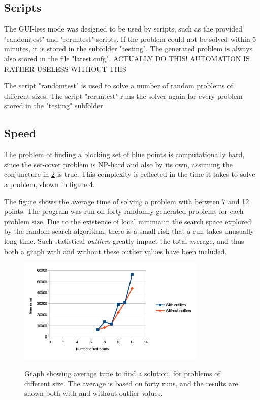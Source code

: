 \documentclass[a4paper,12pt]{article}
\begin{document}
\subsection{Scripts}

The GUI-less mode was designed to be used by scripts, such as the provided "randomtest" and "reruntest" scripts. If the problem could not be solved within 5 minutes, it is stored in the subfolder "testing". The generated problem is always also stored in the file "latest.cnfg". ACTUALLY DO THIS! AUTOMATION IS RATHER USELESS WITHOUT THIS

The script "randomtest" is used to solve a number of random problems of different sizes. The script "reruntest" runs the solver again for every problem stored in the "testing" subfolder.

\subsection{Speed}
The problem of finding a blocking set of blue points is computationally hard, since the set-cover problem is NP-hard and also by its own, assuming the conjuncture in \hyperref[ref:blocking]{2} is true. This complexity is reflected in the time it takes to solve a problem, shown in figure 4.

The figure shows the average time of solving a problem with between 7 and 12 points. The program was run on forty randomly generated problems for each problem size. Due to the existence of local minima in the search space explored by the random search algorithm, there is a small risk that a run takes unusually long time. Such statistical \emph{outliers} greatly impact the total average, and thus both a graph with and without these outlier values have been included.

\begin{figure}[h]
\begin{center}
\label{ref:speed}
\includegraphics[width=0.8\textwidth]{pictures/speedStats.png}
 \caption[Close up of \textit{Hemidactylus} sp.]
   {Graph showing average time to find a solution, for problems of different size. The average is based on forty runs, and the results are shown both with and without outlier values.}
\end{center}
\end{figure}
\end{document}
